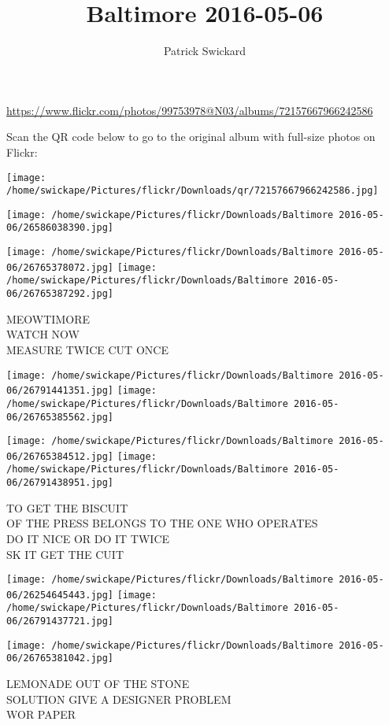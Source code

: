 \documentclass[10pt,letterpaper]{article}
\title{Baltimore 2016-05-06}
\author{Patrick Swickard}
\date{}
\begin{document}
\maketitle

\url{https://www.flickr.com/photos/99753978@N03/albums/72157667966242586}

Scan the QR code below to go to the original album with full-size photos on Flickr:

\texttt{[image: /home/swickape/Pictures/flickr/Downloads/qr/72157667966242586.jpg]}
\pagebreak

\texttt{[image: /home/swickape/Pictures/flickr/Downloads/Baltimore 2016-05-06/26586038390.jpg]}

\vspace{0.25in}
\texttt{[image: /home/swickape/Pictures/flickr/Downloads/Baltimore 2016-05-06/26765378072.jpg]}
\texttt{[image: /home/swickape/Pictures/flickr/Downloads/Baltimore 2016-05-06/26765387292.jpg]}

MEOWTIMORE\\
WATCH NOW\\
MEASURE TWICE CUT ONCE
\pagebreak

\texttt{[image: /home/swickape/Pictures/flickr/Downloads/Baltimore 2016-05-06/26791441351.jpg]}
\texttt{[image: /home/swickape/Pictures/flickr/Downloads/Baltimore 2016-05-06/26765385562.jpg]}

\texttt{[image: /home/swickape/Pictures/flickr/Downloads/Baltimore 2016-05-06/26765384512.jpg]}
\texttt{[image: /home/swickape/Pictures/flickr/Downloads/Baltimore 2016-05-06/26791438951.jpg]}

TO GET THE BISCUIT\\
OF THE PRESS BELONGS TO THE ONE WHO OPERATES\\
DO IT NICE OR DO IT TWICE\\
SK IT GET THE CUIT
\pagebreak

\texttt{[image: /home/swickape/Pictures/flickr/Downloads/Baltimore 2016-05-06/26254645443.jpg]}
\texttt{[image: /home/swickape/Pictures/flickr/Downloads/Baltimore 2016-05-06/26791437721.jpg]}

\texttt{[image: /home/swickape/Pictures/flickr/Downloads/Baltimore 2016-05-06/26765381042.jpg]}

LEMONADE OUT OF THE STONE\\
SOLUTION GIVE A DESIGNER PROBLEM\\
WOR PAPER
\pagebreak
\end{document}

